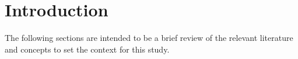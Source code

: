 
\chapter{Introduction} 

\label{intro}

The following sections are intended to be a brief review of the relevant literature and concepts to set the context for this study.





%
%
%
%